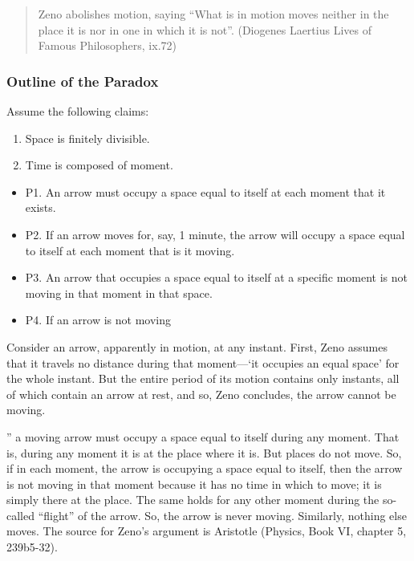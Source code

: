 \documentclass[]{article}
\begin{document}
\begin{quote}
Zeno abolishes motion, saying ``What is in motion moves neither in the
place it is nor in one in which it is not''. (Diogenes Laertius Lives of
Famous Philosophers, ix.72)
\end{quote}

\subsubsection{Outline of the Paradox}\label{outline-of-the-paradox}

Assume the following claims:

\begin{enumerate}
\def\labelenumi{\arabic{enumi}.}
\itemsep1pt\parskip0pt
\item
  Space is finitely divisible.
\item
  Time is composed of moment.
\end{enumerate}

\begin{itemize}
\itemsep1pt\parskip0pt
\item
  P1. An arrow must occupy a space equal to itself at each moment that
  it exists.
\item
  P2. If an arrow moves for, say, 1 minute, the arrow will occupy a
  space equal to itself at each moment that is it moving.
\item
  P3. An arrow that occupies a space equal to itself at a specific
  moment is not moving in that moment in that space.
\item
  P4. If an arrow is not moving
\end{itemize}

Consider an arrow, apparently in motion, at any instant. First, Zeno
assumes that it travels no distance during that moment---`it occupies an
equal space' for the whole instant. But the entire period of its motion
contains only instants, all of which contain an arrow at rest, and so,
Zeno concludes, the arrow cannot be moving.

'' a moving arrow must occupy a space equal to itself during any moment.
That is, during any moment it is at the place where it is. But places do
not move. So, if in each moment, the arrow is occupying a space equal to
itself, then the arrow is not moving in that moment because it has no
time in which to move; it is simply there at the place. The same holds
for any other moment during the so-called ``flight'' of the arrow. So,
the arrow is never moving. Similarly, nothing else moves. The source for
Zeno's argument is Aristotle (Physics, Book VI, chapter 5, 239b5-32).
\end{document}
